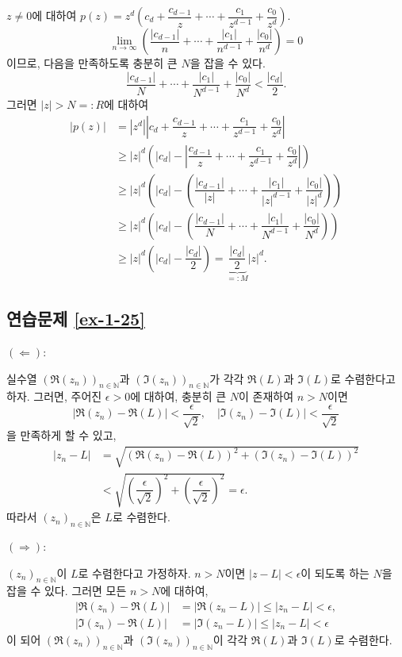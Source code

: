$z\ne0$에 대하여
$p(z) = z^d \left( c_d + \dfrac{c_{d-1}}z + \cdots + \dfrac{c_1}{z^{d-1}}
+ \dfrac{c_0}{z^d} \right)$.
\[
\lim_{n\to\infty}  \left( 
 \dfrac{|c_{d-1}|}n + \cdots + \dfrac{|c_1|}{n^{d-1}}
+ \dfrac{|c_0|}{n^d} \right) = 0
\]
이므로, 
다음을  만족하도록 충분히 큰 $N$을 잡을 수 있다.
\[
\dfrac{|c_{d-1}|}N + \cdots + \dfrac{|c_1|}{N^{d-1}}
+ \dfrac{|c_0|}{N^d} < \dfrac{|c_d|}2.
\]
그러면 $|z|>N=:R$에 대하여
\begin{align*}
|p(z)| &= |z^d| \left|
c_d + \dfrac{c_{d-1}}z + \cdots + \dfrac{c_1}{z^{d-1}}
+ \dfrac{c_0}{z^d} \right| \\
&\ge |z|^d \left( |c_d| - \left| \dfrac{c_{d-1}}z + \cdots + \dfrac{c_1}{z^{d-1}}
+ \dfrac{c_0}{z^d} \right| \right) \\
&\ge |z|^d \left(|c_d| - \left( \dfrac{|c_{d-1}|}{|z|} + \cdots + \dfrac{|c_1|}{|z|^{d-1}}
+ \dfrac{|c_0|}{|z|^d} \right) \right) \\
&\ge |z|^d \left(|c_d| - \left( \dfrac{|c_{d-1}|}N + \cdots + \dfrac{|c_1|}{N^{d-1}}
+ \dfrac{|c_0|}{N^d} \right) \right) \\
&\ge |z|^d \left(|c_d| - \dfrac{|c_d|}2 \right) = \underbrace{\dfrac{|c_d|}2}_{=:M} |z|^d.
\end{align*}

\subsection*{연습문제 \ref{ex-1-25}}

$(\Leftarrow):$ 

실수열 $(\Re(z_n))_{n\in\mathbb N}$과 
$(\Im(z_n))_{n\in\mathbb N}$가 각각 $\Re(L)$과 $\Im(L)$로 수렴한다고 하자.
그러면, 주어진 $\epsilon>0$에 대하여,
충분히 큰 $N$이 존재하여 $n>N$이면
\[
|\Re(z_n) - \Re(L)| < \dfrac\epsilon{\sqrt{2}},\quad
|\Im(z_n) - \Im(L)| < \dfrac\epsilon{\sqrt{2}}
\]
을 만족하게 할 수 있고,
\begin{align*}
|z_n-L| &= \sqrt{ (\Re(z_n) - \Re(L))^2 + (\Im(z_n) - \Im(L))^2} \\
&< \sqrt{\left(\dfrac\epsilon{\sqrt{2}}\right)^2  + \left(\dfrac\epsilon{\sqrt{2}}\right)^2}
= \epsilon.
\end{align*}
따라서 $(z_n)_{n\in\mathbb N}$은 $L$로 수렴한다.

\noindent $(\Rightarrow):$

$(z_n)_{n\in\mathbb N}$이 $L$로 수렴한다고 가정하자.
$n>N$이면  $|z-L|<\epsilon$이 되도록 하는 $N$을 잡을 수 있다.
그러면 모든 $n>N$에 대하여,
\begin{align*}
|\Re(z_n) - \Re(L)| &= |\Re(z_n -L)| \le |z_n -L| <\epsilon, \\
|\Im(z_n) - \Re(L)| &= |\Im(z_n -L)| \le |z_n -L| <\epsilon
\end{align*}
이 되어
$(\Re(z_n))_{n\in\mathbb N}$과 
$(\Im(z_n))_{n\in\mathbb N}$이 각각 
$\Re(L)$과 $\Im(L)$로 수렴한다.

